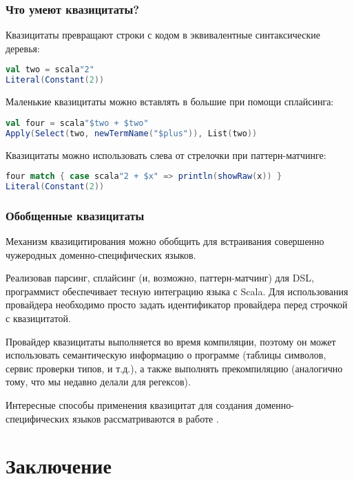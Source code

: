 \documentclass[hyperref={bookmarks=false}]{beamer}
\begin{document}
\begin{frame}[t,fragile]
\frametitle{Что умеют квазицитаты?}

Квазицитаты превращают строки с кодом в эквивалентные синтаксические деревья:

\begin{lstlisting}[language=scala]
val two = scala"2"
Literal(Constant(2))
\end{lstlisting}

Маленькие квазицитаты можно вставлять в большие при помощи сплайсинга:

\begin{lstlisting}[language=scala]
val four = scala"$two + $two"
Apply(Select(two, newTermName("$plus")), List(two))
\end{lstlisting}%

Квазицитаты можно использовать слева от стрелочки при паттерн-матчинге:

\begin{lstlisting}[language=scala]
four match { case scala"2 + $x" => println(showRaw(x)) }
Literal(Constant(2))
\end{lstlisting}%
\end{frame}

\begin{frame}[t,fragile]
\frametitle{Обобщенные квазицитаты}
Механизм квазицитирования можно обобщить для встраивания совершенно чужеродных доменно-специфических языков.

Реализовав парсинг, сплайсинг (и, возможно, паттерн-матчинг) для DSL, программист обеспечивает тесную интеграцию языка с Scala. Для использования провайдера необходимо просто задать идентификатор провайдера перед строчкой с квазицитатой.

Провайдер квазицитаты выполняется во время компиляции, поэтому он может использовать семантическую информацию о программе (таблицы символов, сервис проверки типов, и т.д.), а также выполнять прекомпиляцию (аналогично тому, что мы недавно делали для регексов).

Интересные способы применения квазицитат для создания доменно-специфических языков рассматриваются в работе .

\end{frame}

\section{Заключение}
\end{document}
